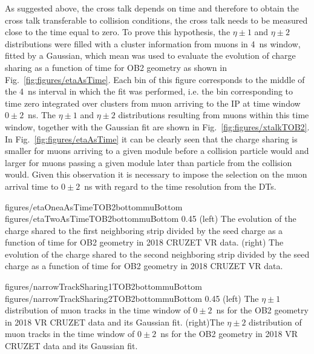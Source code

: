 As suggested above, the cross talk depends on time and therefore to obtain the cross talk transferable to collision conditions, the cross talk needs to be measured close to the time equal to zero. To prove this hypothesis, the $\eta \pm 1$ and $\eta \pm 2$ distributions were filled with a cluster information from muons in 4~ns window, fitted by a Gaussian, which mean was used to evaluate the evolution of charge sharing as a function of time for OB2 geometry as shown in Fig.~\ref{fig:figures/etaAsTime}. Each bin of this figure corresponds to the middle of the 4~ns interval in which the fit was performed, i.e. the bin corresponding to time zero integrated over clusters from muon arriving to the IP at time window $0 \pm 2$~ns. The $\eta \pm 1$ and $\eta \pm 2$ distributions resulting from muons within this time window, together with the Gaussian fit are shown in Fig.~\ref{fig:figures/xtalkTOB2}. In Fig.~\ref{fig:figures/etaAsTime} it can be clearly seen that the charge sharing is smaller for muons arriving to a given module before a collision particle would and larger for muons passing a given module later than particle from the collision would. Given this observation it is necessary to impose the selection on the muon arrival time to $0 \pm 2$~ns with regard to the time resolution from the DTs.

                 {figures/etaOneaAsTimeTOB2bottommuBottom}
                 {figures/etaTwoAsTimeTOB2bottommuBottom} %
                 {0.45}       %
                 {(left) The evolution of the charge shared to the first neighboring strip divided by the seed charge as a function of time for OB2 geometry in 2018 CRUZET VR data.  (right) The evolution of the charge shared to the second neighboring strip  divided by the seed charge as a function of time for OB2 geometry in 2018 CRUZET VR data. }

                 {figures/narrowTrackSharing1TOB2bottommuBottom}
                 {figures/narrowTrackSharing2TOB2bottommuBottom} %
                 {0.45}       %
                 {(left) The $\eta \pm 1$  distribution of muon tracks in the time window of $0 \pm 2$~ns for the OB2 geometry in 2018 VR CRUZET data and its Gaussian fit. (right)The $\eta \pm 2$  distribution of muon tracks in the time window of $0 \pm 2$~ns for the OB2 geometry in 2018 VR CRUZET data and its Gaussian fit.  }




